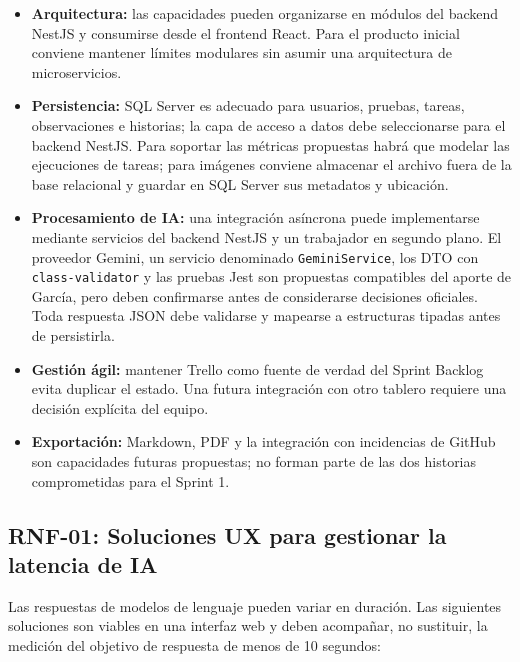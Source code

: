 \documentclass[12pt,a4paper]{article}
\begin{document}
\begin{itemize}
    \item \textbf{Arquitectura:} las capacidades pueden organizarse en módulos del backend NestJS y consumirse desde el frontend React. Para el producto inicial conviene mantener límites modulares sin asumir una arquitectura de microservicios.
    \item \textbf{Persistencia:} SQL Server es adecuado para usuarios, pruebas, tareas, observaciones e historias; la capa de acceso a datos debe seleccionarse para el backend NestJS. Para soportar las métricas propuestas habrá que modelar las ejecuciones de tareas; para imágenes conviene almacenar el archivo fuera de la base relacional y guardar en SQL Server sus metadatos y ubicación.
    \item \textbf{Procesamiento de IA:} una integración asíncrona puede implementarse mediante servicios del backend NestJS y un trabajador en segundo plano. El proveedor Gemini, un servicio denominado \texttt{GeminiService}, los DTO con \texttt{class-validator} y las pruebas Jest son propuestas compatibles del aporte de García, pero deben confirmarse antes de considerarse decisiones oficiales. Toda respuesta JSON debe validarse y mapearse a estructuras tipadas antes de persistirla.
    \item \textbf{Gestión ágil:} mantener Trello como fuente de verdad del Sprint Backlog evita duplicar el estado. Una futura integración con otro tablero requiere una decisión explícita del equipo.
    \item \textbf{Exportación:} Markdown, PDF y la integración con incidencias de GitHub son capacidades futuras propuestas; no forman parte de las dos historias comprometidas para el Sprint 1.
\end{itemize}

\subsection{RNF-01: Soluciones UX para gestionar la latencia de IA}

Las respuestas de modelos de lenguaje pueden variar en duración. Las siguientes
soluciones son viables en una interfaz web y deben acompañar, no sustituir, la
medición del objetivo de respuesta de menos de 10 segundos:
\end{document}
